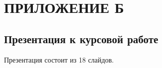 \section*{ПРИЛОЖЕНИЕ Б}

\subsection*{Презентация к курсовой работе}

Презентация состоит из 18 слайдов.
